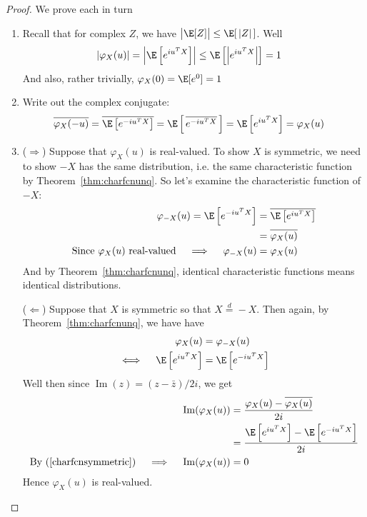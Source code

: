 \documentclass[12pt]{article}
\theoremstyle{plain}
\theoremstyle{definition}
\theoremstyle{remark}
\renewcommand{\Im}{\operatorname{Im}}
\begin{document}
\begin{proof}
We prove each in turn
\begin{enumerate}[label=(\roman*)]
  \item Recall that for complex $Z$, we have
    $\big|\E[Z]\big|\leq \E[\,|Z|\,]$. Well
    \begin{align*}
      |\varphi_X(u)|
      =
      \left\lvert\E\left[e^{iu^TX}\right]\right\rvert
      &\leq
      \E\left[\left\lvert e^{iu^TX}\right\rvert\right]
      = 1
    \end{align*}
    And also, rather trivially, $\varphi_X(0)=\E[e^{0}] = 1$

  \item Write out the complex conjugate:
    \begin{align*}
      \overline{\varphi_X(-u)}
      &=
      \overline{\E\left[e^{-iu^TX}\right]}
      =
      \E\left[\,\overline{e^{-iu^TX}}\,\right]
      =
      \E\left[e^{iu^TX}\right]
      =
      \varphi_X(u)
    \end{align*}

  \item
    ($\Rightarrow$)
    Suppose that $\varphi_X(u)$ is real-valued. To show $X$ is
    symmetric, we need to show $-X$ has the same distribution, i.e. the
    same characteristic function by Theorem~\ref{thm:charfcnunq}. So
    let's examine the characteristic function of $-X$:
    \begin{align*}
      \varphi_{-X}(u)
      =
      \E\left[e^{-iu^TX}\right]
      &=
      \overline{\E\left[e^{iu^TX}\right]} \\
      &=
      \overline{\varphi_X(u)} \\
      \text{Since $\varphi_X(u)$ real-valued}
      \quad\implies\quad
      \varphi_{-X}(u)
      &= \varphi_X(u)
    \end{align*}
    And by Theorem~\ref{thm:charfcnunq}, identical characteristic
    functions means identical distributions.

    ($\Leftarrow$)
    Suppose that $X$ is symmetric so that $X\overset{d}{=}-X$. Then
    again, by Theorem~\ref{thm:charfcnunq}, we have
    have
    \begin{align}
      \varphi_X(u)&=\varphi_{-X}(u) \notag \\
      \iff\quad
      \E\left[e^{iu^TX}\right]
      &= \E\left[e^{-iu^TX}\right]
      \label{charfcnsymmetric}
    \end{align}
    Well then since $\Im(z) = (z - \bar{z})/2i$, we get
    \begin{align*}
      \Im(\varphi_X(u))
      &=
      \frac{\varphi_X(u)-\overline{\varphi_X(u)}}{2i} \\
      &=
      \frac{\E\left[e^{iu^TX}\right]-\E\left[e^{-iu^TX}\right]}{2i} \\
      \text{By (\ref{charfcnsymmetric})}
      \quad\implies\quad
      \Im(\varphi_X(u))
      &=
      0
    \end{align*}
    Hence $\varphi_X(u)$ is real-valued.


\end{enumerate}
\end{proof}
\end{document}
